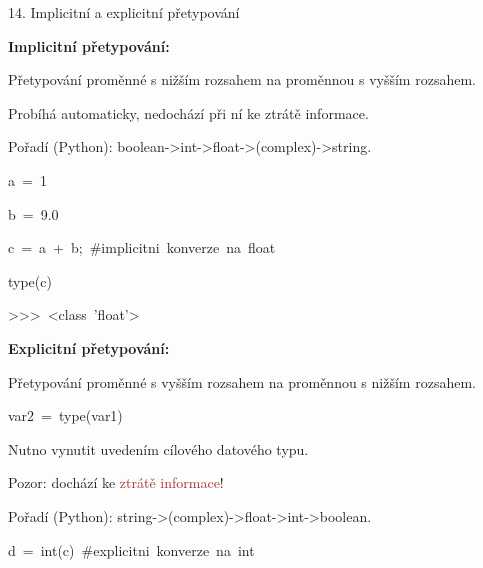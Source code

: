 \documentclass[czech]{beamer}
\newenvironment{lyxcode}
  {\par\begin{list}{}{
    \setlength{\rightmargin}{\leftmargin}
    \setlength{\listparindent}{0pt}%
    \raggedright
    \setlength{\itemsep}{0pt}
    \setlength{\parsep}{0pt}
    \normalfont\ttfamily}%
   \def\{{\char`\{}
   \def\}{\char`\}}
   \def\textasciitilde{\char`\~}
   \item[]}
  {\end{list}}
\begin{document}
\begin{frame}[plain]{14. Implicitní a explicitní přetypování}

{\scriptsize\textbf{Implicitní přetypování:}}{\scriptsize\par}

{\scriptsize Přetypování proměnné s nižším rozsahem na proměnnou s
vyšším rozsahem.}{\scriptsize\par}

{\scriptsize Probíhá automaticky, nedochází při ní ke ztrátě informace.}{\scriptsize\par}

{\scriptsize Pořadí (Python): boolean->int->float->(complex)->string. }{\scriptsize\par}
\begin{lyxcode}
{\scriptsize a~=~1}{\scriptsize\par}

{\scriptsize b~=~9.0}{\scriptsize\par}

{\scriptsize c~=~a~+~b;~\#implicitni~konverze~na~float}{\scriptsize\par}

{\scriptsize type(c)}{\scriptsize\par}

{\scriptsize >\textcompwordmark >\textcompwordmark >~<class~'float'>}{\scriptsize\par}

{\scriptsize\medskip{}
}{\scriptsize\par}
\end{lyxcode}
{\scriptsize\textbf{Explicitní přetypování:}}{\scriptsize\par}

{\scriptsize Přetypování proměnné s vyšším rozsahem na proměnnou s
nižším rozsahem.}{\scriptsize\par}
\begin{lyxcode}
{\scriptsize var2~=~type(var1)}{\scriptsize\par}
\end{lyxcode}
{\scriptsize Nutno vynutit uvedením cílového datového typu. }{\scriptsize\par}

{\scriptsize Pozor: dochází ke }{\scriptsize\textcolor{brown}{ztrátě
informace}}{\scriptsize !}{\scriptsize\par}

{\scriptsize Pořadí (Python): string->(complex)->float->int->boolean.}{\scriptsize\par}
\begin{lyxcode}
{\scriptsize d~=~int(c)~\#explicitni~konverze~na~int}{\scriptsize\par}


\end{lyxcode}
\end{frame}
\end{document}
